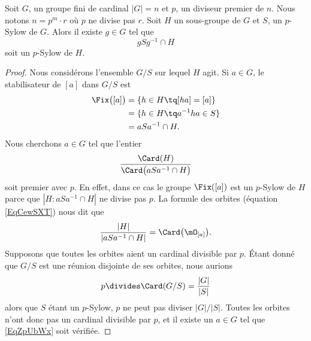 \begin{lemma}       \label{LemwDYQMg}
	Soit \( G\), un groupe fini de cardinal \( | G |=n\) et \( p\), un diviseur premier de \( n\). Nous notons \( n=p^m\cdot r\) où \( p\) ne divise pas \( r\). Soit \( H\) un sous-groupe de \( G\) et \( S\), un \( p\)-Sylow de \( G\). Alors il existe \( g\in G\) tel que
	\begin{equation}
		gSg^{-1}\cap H
	\end{equation}
	soit un \( p\)-Sylow de \( H\).
\end{lemma}

\begin{proof}
	Nous considérons l'ensemble \( G/S\) sur lequel \( H\) agit. Si \( a\in G\), le stabilisateur de \( [a]\) dans \( G/S\) est
	\begin{subequations}
		\begin{align}
			\Fix\big( [a] \big) & =\{ h\in H\tq [ha]=[a] \}     \\
			                    & =\{ h\in H\tq a^{-1}ha\in S\} \\
			                    & =aSa^{-1}\cap H.
		\end{align}
	\end{subequations}
	Nous cherchons \( a\in G\) tel que l'entier
	\begin{equation}        \label{EqZpUbWx}
		\frac{ \Card(H) }{ \Card\big( aSa^{-1}\cap H \big) }
	\end{equation}
	soit premier avec \( p\). En effet, dans ce cas le groupe \( \Fix([a])\) est un \( p\)-Sylow de \( H\) parce que \( | H:aSa^{-1}\cap H |\) ne divise pas \( p\). La formule des orbites (équation \eqref{EqCewSXT}) nous dit que
	\begin{equation}
		\frac{ | H | }{ | aSa^{-1}\cap H | }=\Card\big( \mO_{[a]} \big).
	\end{equation}
	Supposons que toutes les orbites aient un cardinal divisible par \( p\). Étant donné que \( G/S\) est une réunion disjointe de ses orbites, nous aurions
	\begin{equation}
		p\divides \Card(G/S)=\frac{ | G | }{ | S | }
	\end{equation}
	alors que \( S\) étant un \( p\)-Sylow, \( p\) ne peut pas diviser \( | G |/| S |\). Toutes les orbites n'ont donc pas un cardinal divisible par \( p\), et il existe un \( a\in G\) tel que \eqref{EqZpUbWx} soit vérifiée.
\end{proof}


